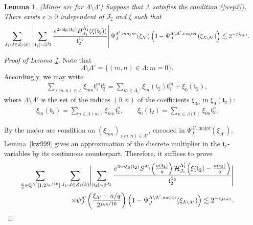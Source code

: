\documentclass[10pt,a4paper]{amsart}
\newtheorem{lemma}{Lemma}\numberwithin{lemma}{section}
\numberwithin{equation}{section}
\begin{document}
\begin{lemma}\label{lee44b9}
[Minor arc for $\Lambda\setminus \Lambda'$] Suppose that $\Lambda$ satisfies   the  condition (\ref{wep2}). There exists $c>0$ independent of $J_2$ and  $\xi$ such that
\begin{equation*}
  \sum_{J_1:J\in Z_{\ell}(k)}   \left| \sum_{|\mathfrak{t}_2|\sim 2^{J_2} }   \frac{e^{2\pi i \xi_0(\mathfrak{t}_2)}H^{\Lambda'_{1}}_{J_{1}}(\xi(\mathfrak{t}_2))}{\mathfrak{t}_2^{{\bf 1}_2} }\right|  \Psi_{J}^{\Lambda',\rm{major}}(\xi_{\Lambda'})
\left(1-\Psi_J^{\Lambda\setminus \Lambda',\rm{major}}(\xi_{\Lambda\setminus\Lambda'})\right) \lesssim 2^{-cj_{\ell+1}}.
\end{equation*}
\end{lemma}
\begin{proof}[Proof of Lemma \ref{lee44b9}] 
Note that
\[
\Lambda\setminus \Lambda'
=
\{(m,n)\in \Lambda : m=0\}.
\]
Accordingly, we may write
\begin{align*}
\sum_{(m,n)\in\Lambda}\xi_{mn}\mathfrak{t}_1^m\mathfrak{t}_2^n
=
\sum_{m\in \Lambda_1'} \xi_m(\mathfrak{t}_2)\mathfrak{t}_1^m
+\xi_0(\mathfrak{t}_2),
\end{align*}
where $\Lambda\setminus \Lambda'$ is the set of the indices $(0,n)$ of the coefficients $\xi_{0n}$ in $\xi_0(\mathfrak{t}_2)$:
\begin{align}\label{0011}
\xi_m(\mathfrak{t}_2)
=
\sum_{n\in \Lambda(m)} \xi_{mn}\mathfrak{t}_2^n,
\qquad
\xi_0(\mathfrak{t}_2)
=
\sum_{n\in \Lambda(0)} \xi_{0n}\mathfrak{t}_2^n.
\end{align}

By the major arc condition on $(\xi_{mn})_{(m,n)\in\Lambda'}$, encoded in
$\Psi_{J}^{\Lambda',\mathrm{major}}(\xi_{\Lambda'})$, Lemma~\ref{kw999} gives an approximation of the discrete multiplier in the $\mathfrak{t}_1$-variables by its continuous counterpart. Therefore, it suffices to prove
\begin{align}\label{t8}
\sum_{\frac{a}{q}\in \mathbb{Q}^{\Lambda'}[1,2^{j_k/10}]}
\sum_{J_1:J\in Z_{\ell}(k)}
\Biggl|
\sum_{|\mathfrak{t}_2|\sim 2^{J_2}}
\frac{
e^{2\pi i \xi_0(\mathfrak{t}_2)}
S^{\Lambda_1'}\!\left(\frac{a(\mathfrak{t}_2)}{q}\right)
\mathcal{H}^{\Lambda_1'}_{J_1}\!\left(\xi(\mathfrak{t}_2)-\frac{a(\mathfrak{t}_2)}{q}\right)
}{
\mathfrak{t}_2^{{\bf 1}_2}
}
\Biggr|
\\
\qquad\qquad\times
\psi_J^{\Lambda'}\!\left(\frac{\xi_{\Lambda'}-a/q}{2^{j_k\rho/10}}\right)
\left(1-\Psi_J^{\Lambda\setminus \Lambda',\mathrm{major}}(\xi_{\Lambda\setminus\Lambda'})\right)
\lesssim 2^{-c j_{\ell+1}}.\notag
\end{align}



\end{proof}
\end{document}
